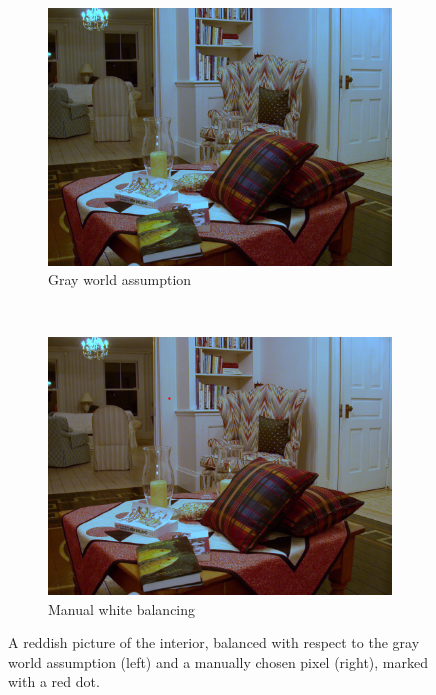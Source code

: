 \documentclass[a4paper]{article}
\begin{document}
\begin{figure}[H]
	\vspace{3mm}
	\begin{subfigure}[h]{0.48\textwidth}
		\centering
		\includegraphics[width=\textwidth]{interior_gray-world1}
		\caption*{Gray world assumption}
	\end{subfigure}
	~
	\begin{subfigure}[h]{0.48\textwidth}
		\centering
		\includegraphics[width=\textwidth]{interior_manual1}
		\caption*{Manual white balancing}
	\end{subfigure}	
\caption{A reddish picture of the interior, balanced with respect to the gray world assumption (left) and a manually chosen pixel (right), marked with a red dot.}
\label{fig:interior-balance}
\end{figure}
\end{document}

